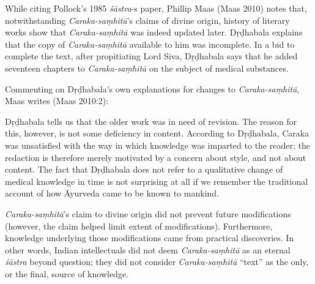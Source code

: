 While citing Pollock's 1985 {\sl śāstra}-s paper, Phillip Maas (Maas 2010) notes that, notwithstanding {\sl Caraka-saṃhitā}'s claims of divine origin, history of literary works show that {\sl Caraka-saṃhitā} was indeed updated later.  Dṛḍhabala explains that the copy of {\sl Caraka-saṃhitā} available to him was incomplete.  In a bid to complete the text, after propitiating Lord Siva, Dṛḍhabala says that he added seventeen chapters to {\sl Caraka-saṃhitā} on the subject of medical substances.

Commenting on Dṛḍhabala's own explanations for changes to {\sl Caraka-saṃhitā}, Maas writes (Maas 2010:2): 
\begin{myquote}
Dṛḍhabala tells us that the older work was in need of revision. The reason for this, however, is not some deficiency in content. According to Dṛḍhabala, Caraka was unsatisfied with the way in which knowledge was imparted to the reader; the redaction is therefore merely motivated by a concern about style, and not about content. The fact that Dṛḍhabala does not refer to a qualitative change of medical knowledge in time is not surprising at all if we remember the traditional account of how Āyurveda came to be known to mankind.
\end{myquote}

{\sl Caraka-saṃhitā}'s claim to divine origin did not prevent future modifications (however, the claim helped limit extent of modifications).  Furthermore, knowledge underlying those modifications came from practical discoveries.  In other words, Indian intellectuals did not deem {\sl Caraka-saṃhitā} as an eternal {\sl śāstra} beyond question; they did not consider {\sl Caraka-saṃhitā} ``text'' as the only, or the final, source of knowledge.

